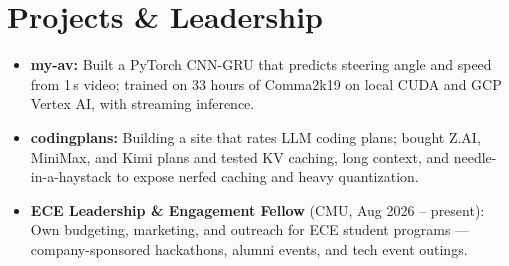 \documentclass[11pt, letterpaper]{article}
\begin{document}
\section{Projects \& Leadership}
\begin{itemize}
  \item \textbf{my-av:} Built a PyTorch CNN-GRU that predicts steering angle and speed from 1\,s video; trained on 33 hours of Comma2k19 on local CUDA and GCP Vertex AI, with streaming inference.
  \item \textbf{codingplans:} Building a site that rates LLM coding plans; bought Z.AI, MiniMax, and Kimi plans and tested KV caching, long context, and needle-in-a-haystack to expose nerfed caching and heavy quantization.
  \item \textbf{ECE Leadership \& Engagement Fellow} (CMU, Aug 2026 -- present): Own budgeting, marketing, and outreach for ECE student programs --- company-sponsored hackathons, alumni events, and tech event outings.
\end{itemize}
\end{document}
